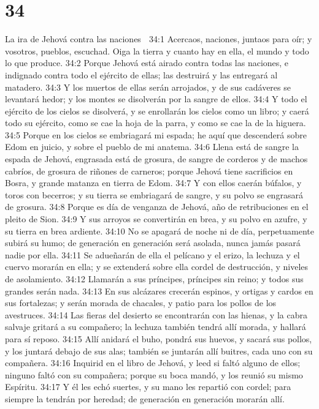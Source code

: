 \chapter{34}

La ira de Jehová contra las naciones  

34:1 Acercaos, naciones, juntaos para oír; y vosotros, pueblos, escuchad. Oiga la tierra y cuanto hay en ella, el mundo y todo lo que produce.  
34:2 Porque Jehová está airado contra todas las naciones, e indignado contra todo el ejército de ellas; las destruirá y las entregará al matadero.  
34:3 Y los muertos de ellas serán arrojados, y de sus cadáveres se levantará hedor; y los montes se disolverán por la sangre de ellos.  
34:4 Y todo el ejército de los cielos se disolverá, y se enrollarán los cielos como un libro; y caerá todo su ejército, como se cae la hoja de la parra, y como se cae la de la higuera. 
34:5 Porque en los cielos se embriagará mi espada; he aquí que descenderá sobre Edom en juicio, y sobre el pueblo de mi anatema.  
34:6 Llena está de sangre la espada de Jehová, engrasada está de grosura, de sangre de corderos y de machos cabríos, de grosura de riñones de carneros; porque Jehová tiene sacrificios en Bosra, y grande matanza en tierra de Edom. 
34:7 Y con ellos caerán búfalos, y toros con becerros; y su tierra se embriagará de sangre, y su polvo se engrasará de grosura.  
34:8 Porque es día de venganza de Jehová, año de retribuciones en el pleito de Sion.  
34:9 Y sus arroyos se convertirán en brea, y su polvo en azufre, y su tierra en brea ardiente.  
34:10 No se apagará de noche ni de día, perpetuamente subirá su humo; de generación en generación será asolada, nunca jamás pasará nadie por ella.  
34:11 Se adueñarán de ella el pelícano y el erizo, la lechuza y el cuervo morarán en ella; y se extenderá sobre ella cordel de destrucción, y niveles de asolamiento. 
34:12 Llamarán a sus príncipes, príncipes sin reino; y todos sus grandes serán nada.  
34:13 En sus alcázares crecerán espinos, y ortigas y cardos en sus fortalezas; y serán morada de chacales, y patio para los pollos de los avestruces.  
34:14 Las fieras del desierto se encontrarán con las hienas, y la cabra salvaje gritará a su compañero; la lechuza también tendrá allí morada, y hallará para sí reposo.  
34:15 Allí anidará el buho, pondrá sus huevos, y sacará sus pollos, y los juntará debajo de sus alas; también se juntarán allí buitres, cada uno con su compañera.  
34:16 Inquirid en el libro de Jehová, y leed si faltó alguno de ellos; ninguno faltó con su compañera; porque su boca mandó, y los reunió su mismo Espíritu.  
34:17 Y él les echó suertes, y su mano les repartió con cordel; para siempre la tendrán por heredad; de generación en generación morarán allí.  

